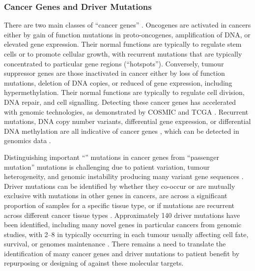 \subsubsection{Cancer Genes and Driver Mutations}
There are two main classes of ``\glspl{cancer gene}'' \citep{Futreal2001}. Oncogenes are activated in cancers either by gain of function \glspl{mutation} in proto-oncogenes, amplification of \acrshort{DNA}, or elevated \gls{gene expression}. Their normal functions are typically to regulate stem cells or to promote cellular growth, with \glspl{recurrent mutation} that are typically concentrated to particular gene regions (``hotspots''). Conversely, \gls{tumour suppressor} genes are those inactivated in cancer either by loss of function \glspl{mutation}, deletion of \acrshort{DNA} copies, or reduced of \gls{gene expression}, including hypermethylation. Their normal functions are typically to regulate cell division, \acrshort{DNA} repair, and cell signalling.
%
Detecting these \glspl{cancer gene} has accelerated with \gls{genomic} technologies, as demonstrated by \gls{COSMIC} and \gls{TCGA} \citep{COSMICdb, TCGA2013PAN}. Recurrent \glspl{mutation}, \acrshort{DNA} copy number variants, differential \gls{gene expression}, or differential \acrshort{DNA} methylation are all indicative of \glspl{cancer gene} \citep{Mattison2009}, which can be detected in \glspl{genomic} data \citep{METABRIC2016, TCGA2013PAN}. %

Distinguishing important ``'' \glspl{mutation} in \glspl{cancer gene} from ``\gls{passenger mutation}'' \glspl{mutation} is challenging due to patient variation, tumour heterogeneity, and genomic instability producing many variant gene sequences \citep{Stratton2009, Tran2012}. Driver \glspl{mutation} can be identified by whether they co-occur or are mutually exclusive with \glspl{mutation} in other genes in cancers, are  across a significant proportion of samples for a specific tissue type, or if \glspl{mutation} are recurrent across different cancer tissue types \citep{ICGC2011, TCGA2013PAN, METABRIC2016, COSMICdb, cBioPortal}. Approximately 140 \glspl{driver mutation} have been identified, including many novel genes in particular cancers from \gls{genomic} studies, with 2--8 in typically occurring in each tumour usually affecting cell fate, survival, or \glspl{genome} maintenance \citep{Vogelstein2013}. There remains a need to translate the identification of many \glspl{cancer gene} and \glspl{driver mutation} to patient benefit  %
by repurposing or designing of  against these molecular targets.  %

